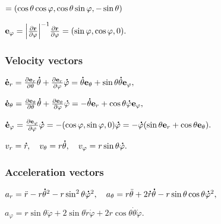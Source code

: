 $=\qty(\cos\theta\cos\varphi,\cos\theta\sin\varphi,-\sin\theta)$

$\vec{e}_{\varphi}=\abs{\pdv{\vec{r}}{\varphi}}^{-1}\pdv{\vec{r}}{\varphi}=\qty(\sin\varphi,\cos\varphi,0).$
\subsubsection*{Velocity vectors}
$\dot{\vec{e}}_{r}=\pdv{\vec{e}_{r}}{\theta}\dot{\theta}+\pdv{\vec{e}_{r}}{\varphi}\dot{\varphi}=\dot\theta\vec{e}_{\theta}+\sin\theta\dot\theta\vec{e}_{\varphi},$

$\dot{\vec{e}}_{\theta}=\pdv{\vec{e}_{\theta}}{\theta}\dot{\theta}+\pdv{\vec{e}_{\theta}}{\varphi}\dot{\varphi}=-\dot\theta\vec{e}_{r}+\cos\theta\dot\varphi\vec{e}_{\varphi},$

$\dot{\vec{e}}_{\varphi}=\pdv{\vec{e}_{\varphi}}{\varphi}\dot\varphi=-\qty(\cos\varphi,\sin\varphi,0)\dot\varphi=-\dot\varphi\qty(\sin\theta\vec{e}_{r}+\cos\theta\vec{e}_{\theta}).$

$v_{r}=\dot{r},\hsma v_{\theta}=r\dot{\theta},\hsma v_{\varphi}=r\sin\theta\dot{\varphi}.$
\subsubsection*{Acceleration vectors}
$a_{r}=\ddot{r}-r\dot{\theta}^{2}-r\sin^{2}\theta\dot{\varphi}^{2},\hsma a_{\theta}=r\ddot{\theta}+2\dot{r}\dot{\theta}-r\sin\theta\cos\theta\dot{\varphi}^{2},$

$a_{\varphi}=r\sin\theta\ddot{\varphi}+2\sin\theta\dot{r}\dot{\varphi}+2r\cos\theta\dot{\theta}\dot{\varphi}.$



































